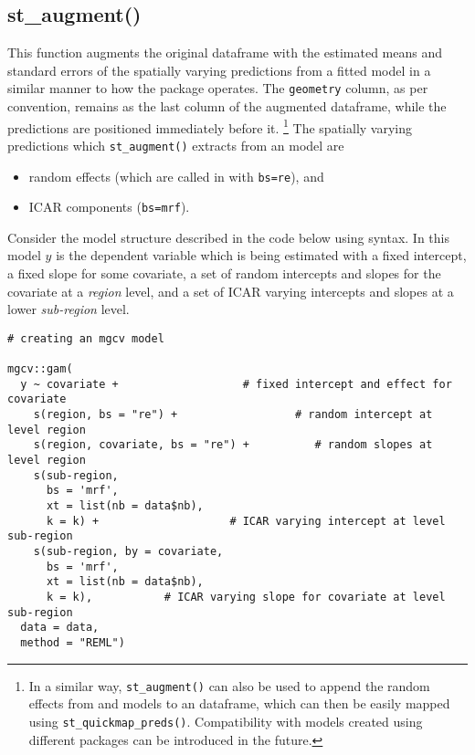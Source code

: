 \subsection{st\_augment()}\label{st_augment}

This function augments the original dataframe with the estimated means
and standard errors of the spatially varying predictions from a fitted  model in a similar manner to
how the  package \citep{broom} operates. The \texttt{geometry} column, as per convention, remains as the last column of the augmented dataframe, while the predictions are positioned immediately before it. \footnote{In a similar way, \texttt{st\_augment()} can also be used to append the random effects from  \citep{lme4} and  \citep{nlme} models to an  dataframe, which can then be easily mapped using \texttt{st\_quickmap\_preds()}. Compatibility with models created using different packages can be introduced in the future.} The spatially varying predictions which \texttt{st\_augment()} extracts from an  model are

\begin{itemize}
\tightlist
\item
  random effects (which are called in  with \texttt{bs=\textquotesingle{}re\textquotesingle{}}), and
\item
  ICAR components (\texttt{bs=\textquotesingle{}mrf\textquotesingle{}}).
\end{itemize}

Consider the model structure described in the code below using  syntax. In this model \(y\) is the dependent variable which is being estimated with a fixed intercept, a fixed slope for some covariate, a set of random intercepts and slopes for the covariate at a \emph{region} level, and a set of ICAR varying intercepts and slopes at a lower \emph{sub-region} level.

\begin{verbatim}
# creating an mgcv model

mgcv::gam(
  y ~ covariate +                   # fixed intercept and effect for covariate
    s(region, bs = "re") +                  # random intercept at level region
    s(region, covariate, bs = "re") +          # random slopes at level region
    s(sub-region,
      bs = 'mrf',
      xt = list(nb = data$nb),
      k = k) +                    # ICAR varying intercept at level sub-region
    s(sub-region, by = covariate,
      bs = 'mrf',
      xt = list(nb = data$nb),
      k = k),           # ICAR varying slope for covariate at level sub-region
  data = data,
  method = "REML")
\end{verbatim}


